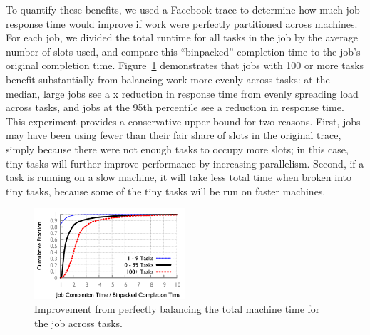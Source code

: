 
To quantify these benefits, we used a Facebook trace to determine how much
job response time would improve if work were perfectly partitioned across
machines. For each job, we divided the total runtime for all tasks in the
job by the average number of slots used, and compare this ``binpacked''
completion time to the job's original completion time.
Figure~\ref{fig:binpacked}
demonstrates that jobs with 100 or more tasks benefit substantially from
balancing work more evenly across tasks: at the median, large jobs see
a x reduction in response time from evenly spreading load
across tasks, and
jobs at the 95th percentile see a  reduction in response time.
This experiment provides a conservative upper bound for two reasons. First, jobs
may have been using fewer than their fair share of slots in the original trace,
simply because there were not enough tasks to occupy more slots; in this case,
tiny tasks will further improve performance by increasing parallelism. Second,
if a task is running on a slow machine, it will take less total time when
broken into tiny tasks, because some of the tiny tasks will be run on faster
machines.

\begin{figure}[!t]
\centering
\hspace{2ex}
\includegraphics[width=0.5\textwidth]{figures/binpacked1-sep}
\vspace{-4ex}
\caption{Improvement from perfectly balancing the total machine time for the
job across tasks.}
\vspace{-2ex}
\label{fig:binpacked}
\end{figure}



